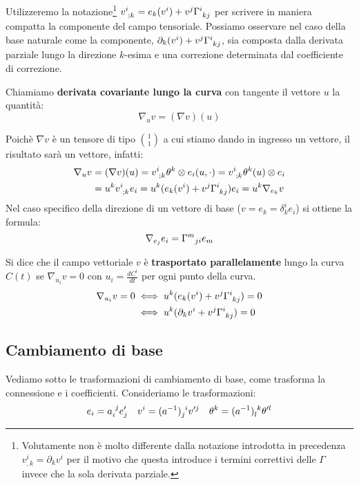 Utilizzeremo la notazione\footnote{Volutamente non è molto differente dalla notazione introdotta in precedenza $v^i_{,k}=\partial_k v^i$ per il motivo che questa introduce i termini correttivi delle $\Gamma$ invece che la sola derivata parziale.} $\tensor{v}{^i_{;k}}= e_k(v^i) + v^j\tensor{\Gamma}{^i_{kj}}$ per scrivere in maniera compatta la componente del campo tensoriale. Possiamo osservare nel caso della base naturale come la componente,  $\partial_k(v^i) + v^j\tensor{\Gamma}{^i_{kj}}$, sia composta dalla derivata parziale lungo la direzione $k$-esima e una correzione determinata dal coefficiente di correzione.
\begin{definizione}
Chiamiamo \textbf{derivata covariante lungo la curva} con tangente il vettore $u$ la quantità:
\begin{equation*}
    \nabla_u v =(\nabla v)(u)
\end{equation*}
\end{definizione}

Poichè $\nabla v$ è un tensore di tipo $\binom{1}{1}$ a cui stiamo dando in ingresso un vettore, il risultato sarà un vettore, infatti:
\begin{align*}
    \nabla_u v &=(\nabla v)(u) = \tensor{v}{^i_{;k}} \theta^k \otimes e_i (u, \cdot ) = \tensor{v}{^i_{;k}} \theta^k(u) \otimes e_i \\
    &= u^k \tensor{v}{^i_{;k}} e_i = u^k( e_k(v^i) + v^j\tensor{\Gamma}{^i_{kj}})e_i = u^k\nabla_{e_k}v
\end{align*}
Nel caso specifico della direzione di un vettore di base ($v= e_k=\delta^i_ke_i$) si ottiene la formula:
\begin{equation}
    \nabla_{e_j}e_i = \tensor{\Gamma}{^m}_{ji}e_m
    \label{eq.covbasee}
\end{equation}
\begin{definizione}
Si dice che il campo vettoriale $v$ è \textbf{trasportato parallelamente} lungo la curva $C(t)$ se $\nabla_{u_i} v= 0$ con $u_i = \frac{dC^i}{dt}$ per ogni punto della curva.
\begin{align*}
    \nabla_{u_i} v = 0 &\iff u^k( e_k(v^i) + v^j\tensor{\Gamma}{^i_{kj}})= 0 \\
     & \iff u^k( \partial_kv^i + v^j\tensor{\Gamma}{^i_{kj}}) = 0
\end{align*}
\end{definizione}

\subsection{Cambiamento di base}
Vediamo sotto le trasformazioni di cambiamento di base, come trasforma la connessione e i coefficienti.
Consideriamo le trasformazioni:
\begin{align*}
    e_i= \tensor{a}{_i^j} e'_j && v^i = \tensor{(a^{-1})}{_j^i}v'^j && \theta^k = \tensor{(a^{-1})}{_l^k}\theta'^l
\end{align*}

